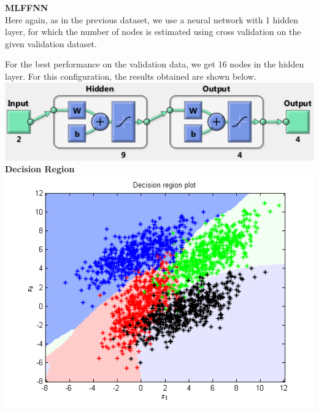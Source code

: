 \documentclass{article}
\begin{document}
\begin{flushleft}
\textbf{MLFFNN} \\[10pt]
Here again, as in the previous dataset, we use a neural network with 1 hidden layer, for which the number of nodes is estimated using cross validation on the given validation dataset.

For the best performance on the validation data, we get 16 nodes in the hidden layer. For this configuration, the results obtained are shown below.
\\[5pt]
\includegraphics[scale=0.6]{Classification/overlapping/net_config}
\newpage
\textbf{\\[5pt]Decision Region\\[10pt]}
\includegraphics[scale=1]{Classification/overlapping/decn_region_nn}
\end{flushleft}
\end{document}
